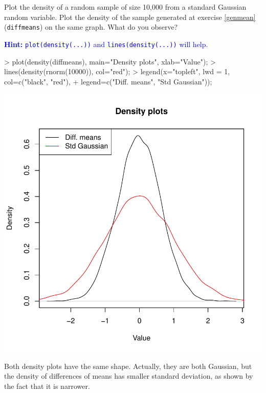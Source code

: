 \documentclass[a4paper]{article}
\theoremstyle{definition}
\begin{document}
\begin{Exercise}
Plot the density of a random sample of size 10,000 from a standard
Gaussian random variable. Plot the density of the sample generated
at exercise \ref{genmean} (\texttt{diffmeans})
on the same graph. What do you observe?
\par\noindent\textcolor{Blue}{\textbf{Hint:} \texttt{plot(density(...))}
 and \texttt{lines(density(...))} will help.}
\end{Exercise}
\begin{Answer}
\begin{Schunk}
\begin{Sinput}
> plot(density(diffmeans), main="Density plots", xlab="Value");
> lines(density(rnorm(10000)), col="red");
> legend(x="topleft", lwd = 1, col=c("black", "red"),
+    legend=c("Diff. means", "Std Gaussian"));
\end{Sinput}
\end{Schunk}
\includegraphics{ttest-007}
\par
Both density plots have the same shape. Actually, they are both
Gaussian, but the density of differences of means has smaller
standard deviation, as shown by the fact that it is narrower.
\end{Answer}
\end{document}
